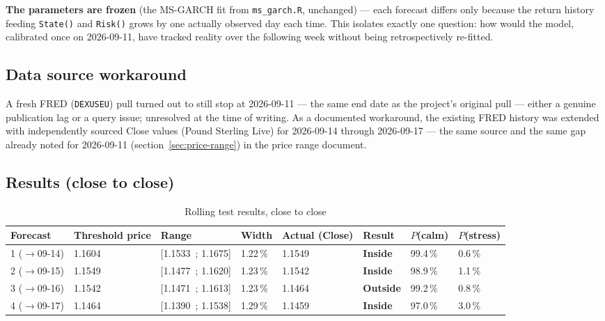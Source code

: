 \documentclass[12pt,a4paper]{article}
\begin{document}
\vspace{0.3cm}

\textbf{The parameters are frozen} (the MS-GARCH fit from
\texttt{ms\_garch.R}, unchanged) --- each forecast differs only
because the return history feeding \texttt{State()} and
\texttt{Risk()} grows by one actually observed day each time. This
isolates exactly one question: how would the model, calibrated
once on 2026-09-11, have tracked reality over the following
week without being retrospectively re-fitted.

\subsection{Data source workaround}

A fresh FRED (\texttt{DEXUSEU}) pull turned out to still stop
at 2026-09-11 --- the same end date as the project's
original pull --- either a genuine publication lag or a
query issue; unresolved at the time of writing. As a
documented workaround, the existing FRED history was extended with
independently sourced Close values (Pound Sterling Live) for
2026-09-14 through 2026-09-17 --- the same source and the same gap already noted
for 2026-09-11 (section~\ref{sec:price-range}) in the price
range document.

\subsection{Results (close to close)}

\begin{table}[H]
	\centering
	\small
	\caption{Rolling test results, close to close}
	\begin{tabular}{|p{1.5cm}|p{1.5cm}|p{1.5cm}|p{1.5cm}|p{1.5cm}|p{1.5cm}|p{1.5cm}|p{1.5cm}|}
		\hline
		Forecast & Threshold price & Range & Width & Actual (Close) & Result & $P$(calm) & $P$(stress) \\
		\hline
		1 ($\to$09-14) & 1.1604 & [1.1533~; 1.1675] & 1.22\,\% & 1.1549 & \textbf{Inside} & 99.4\,\% & 0.6\,\% \\
		\hline
		2 ($\to$09-15) & 1.1549 & [1.1477~; 1.1620] & 1.23\,\% & 1.1542 & \textbf{Inside} & 98.9\,\% & 1.1\,\% \\
		\hline
		3 ($\to$09-16) & 1.1542 & [1.1471~; 1.1613] & 1.23\,\% & 1.1464 & \textbf{Outside} & 99.2\,\% & 0.8\,\% \\
		\hline
		4 ($\to$09-17) & 1.1464 & [1.1390~; 1.1538] & 1.29\,\% & 1.1459 & \textbf{Inside} & 97.0\,\% & 3.0\,\% \\
		\hline
	\end{tabular}
\end{table}
\end{document}
